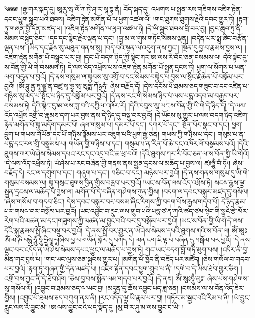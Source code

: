 \setcounter{footnote}{0} 
༄༅༅། །རྒྱ་གར་སྐད་དུ། ཨཱརྱཱ་ཝ་ལོ་ཀ་ཏེ་ཤྭ་ར་སཱ་དྷ་ནཾ། བོད་སྐད་དུ། འཕགས་པ་སྤྱན་རས་གཟིགས་འཇིག་རྟེན་དབང་ཕྱུག་སྒྲུབ་པའི་ཐབས། འཇིག་རྟེན་མགོན་པོ་ལ་ཕྱག་འཚལ་ལོ། །གང་ཐུགས་ཐུགས་རྗེའི་དབང་གྱུར་ཏེ། །རྟག་ཏུ་གཞན་གྱི་དོན་མཛད་པ། །འཇིག་རྟེན་མགོན་ལ་ཕྱག་འཚལ་ཏེ། །དེ་ཡི་སྒྲུབ་ཐབས་བྲི་བར་བྱ། །བྱང་ཆུབ་ཏུ་ནི་སེམས་བསྐྱེད་ཅིང་། །དད་དང་སྙིང་རྗེར་ལྡན་པ་དང་། །བླ་མ་ལ་གུས་གཏོང་སེམས་ལྡན། །བདེན་པར་སྨྲ་ཞིང་བརྩོན་ལྡན་པས། །ཡིད་དང་རྗེས་སུ་མཐུན་གནས་སུ། །བདེ་བའི་སྟན་ལ་འདུག་ནས་ཀྱང་། །སྔོན་དུ་བྱ་བ་རྣམས་བྱས་ལ། །འཇིག་རྟེན་མགོན་པོ་བསྒྲུབ་པར་བྱ། །དང་པོ་བདག་ཉིད་ཀྱི་སྙིང་གར་ཨ་ལས་རི་བོང་ཅན་བསམས་ལ། དེའི་སྟེང་དུ་ས་བོན་གྱི་ཡི་གེ་བསམས་ཏེ། དེ་ལས་འོད་འཕྲོས་པས་འཇིག་རྟེན་མགོན་པོ་སྤྱན་དྲངས་ཏེ། ཕྱག་ལ་སོགས་པ་ཡན་ལག་བདུན་པ་བྱའོ། །དེ་ནས་གསུམ་ལ་སྐྱབས་སུ་འགྲོ་བ་དང་སེམས་བསྐྱེད་པ་བྱས་ལ་སྙིང་རྗེ་ཆེན་པོ་བསྒོམ་པར་བྱའོ། །ཨོཾ་ཤཱུ་ནྱ་ཏཱ་ཛྙཱ་ན་བཛྲ་སྭ་བྷཱ་ཝ་ཨཱཏྨ་ཀོ྅ཧཾ། ཞེས་བརྗོད་དོ། །དེས་དངོས་པོ་ཐམས་ཅད་གཟུང་བ་དང་འཛིན་པ་གཉིས་སུ་མེད་པ་སྟོང་པ་ཉིད་དུ་བསྒོམ་པར་བྱའོ། །དེ་ནས་རང་གི་སེམས་ཉིད་པཾ་ལས་པདྨ་འདབ་མ་བརྒྱད་པར་བསམས་ཏེ། དེའི་སྟེང་དུ་ཨ་ལས་ཟླ་བའི་དཀྱིལ་འཁོར་རོ། །དེའི་དབུས་སུ་ཡང་ས་བོན་གྱི་ཡི་གེ་དེ་ཉིད་དོ། །དེ་ལས་འོད་འཕྲོས་འགྲོ་བ་རྣམས་དག་པར་བྱས་ནས་དེ་ཉིད་དུ་བསྡུ་བར་བྱའོ། །དེ་ཡོངས་སུ་གྱུར་པ་ལས་བདག་ཉིད་འཇིག་རྟེན་མགོན་པོ་སྐུ་མདོག་དམར་པོ། ཞལ་གསུམ་པ། དམར་པོ་དང་། དཀར་པོ་དང་། སྔོན་པོར་སྣང་བ་དང་། ཕྱག་དྲུག་པ་གཡས་གཡོན་དང་པོ་གཉིས་སྙོམས་པར་འཇུག་པའི་ཕྱག་རྒྱ་ཅན། གཡས་ཀྱི་གཉིས་པ་དང་། གསུམ་པ་ན་པདྨ་དང་རལ་གྲི་བསྣམས་པ། གཡོན་གྱི་གཉིས་པ་དང་། གསུམ་པ་ན་རིན་པོ་ཆེ་དང་འཁོར་ལོ་བསྣམས་པའོ། །དེའི་ཐུགས་ཀར་ཡེ་ཤེས་སེམས་དཔའ་རང་དང་འདྲ་བའི་ཆ་ཕྲ་བའོ། །དེའི་ཐུགས་ཀར་རི་བོང་ཅན་ལ་ས་བོན་གྱི་ཡི་གེའོ། །དེ་ལས་འོད་འཕྲོས་ཏེ། ཡེ་ཤེས་པ་རང་བཞིན་གྱི་གནས་ནས་སྤྱན་དྲངས་ལ་མཆོད་པ་བྱས་ལ། ཛཿཧཱུྃ་བཾ་ཧོཿ། ཞེས་བརྗོད་དེ། རང་ལ་དགུག་པ་དང་། གཞུག་པ་དང་། བཅིང་བ་དང་། མཉེས་པར་བྱའོ། །དེ་ནས་གནས་གསུམ་དུ་ཡི་གེ་གསུམ་བསམས་ལ། སྐུ་གསུང་ཐུགས་བྱིན་གྱིས་བརླབ་པར་བྱའོ། །ཡང་ས་བོན་ལས་འོད་འཕྲོས་ཏེ། སངས་རྒྱས་ལྔ་སྤྱན་དྲངས་ལ་མཆོད་པ་བྱས་ལ། མགོན་པོ་དེ་བཞིན་གཤེགས་ཀུན་གྱིས། །བདག་ལ་དབང་བསྐུར་མཛད་དུ་གསོལ། །ཞེས་གསོལ་བ་གདབ་ཅིང་། དེས་དབང་བསྐུར་བར་བསམ་ཞིང་རིགས་ཀྱི་བདག་པོས་རྒྱས་གདབ་པོ། དེ་ཉིད་རྣམ་པར་གསལ་བར་བསྒོམ་པར་བྱའོ། །ཡང་འབྱུང་བ་རླུང་ལས་གྲུབ་པའི་པདྨ་ཙ་ན་ཀའི་ཚད་ཙམ་སྟེང་གི་སྣའི་རྩེ་མོར་རེག་པའི་མཚན་མ་དང་།གཟུགས་ཀྱི་མཚན་མ་བྱུང་བའི་བར་དུ་བསྒོམ་པར་བྱའོ། །ཡང་ས་བོན་གྱི་ཡི་གེ་དེ་ལས་དེའི་སྐུ་རྣམས་སྤྲོ་ཞིང་བསྡུ་བར་བྱའོ། །དེ་ནས་སྤྲོ་བར་གྱུར་ན་ཡེ་ཤེས་སེམས་དཔའི་ཐུགས་ཀའི་ས་བོན་ལ། ཨོཾ་ཨཱཿཨོཾ་མ་ཎི་པདྨེ་ཧཱུྃ་ཧཱུཾ་ཧྲཱིསྭཱ་ཧཱ།ཞེས་བྱ་བ་གཡོན་སྐོར་དུ་བཀོད་དེ། མན་ངག་ཇི་ལྟ་བ་བཞིན་དུ་བསྒོམ་པར་བྱའོ། །དེ་ནས་ལྡང་བར་འདོད་ན་ཡེ་ཤེས་སེམས་དཔའ་ཕྱུང་ལ་མཆོད་པ་བྱས་ཏེ། གང་ཡང་བདག་བློ་གཏི་མུག་པས། །འདིར་ནི་བྱ་མིན་གང་བྱས་པ། །གང་ཡང་ལུས་ཅན་སྐྱབས་གྱུར་པ། །མགོན་པོ་ཁྱོད་ནི་བཟོད་པར་མཛོད། །ཅེས་གསོལ་བ་གདབ་པར་བྱའོ། །རྟག་ཏུ་གཞན་གྱི་དོན་མཛད་པ། །འཇིག་རྟེན་དབང་ཕྱུག་གྲུབ་པ་ནི། །དགེ་བ་དེ་ཡིས་ཐོབ་གྱུར་ཅིག །འགྲོ་བས་ཀྱང་ནི་དེ་ཐོབ་ཤོག །ཅེས་བྱ་བས་སྨོན་ལམ་གདབ་པར་བྱའོ། །དེ་ནས། ཨོཾ་ཨཱཿཧཱུྃ་མུཿ། ཞེས་པས་གཤེགས་སུ་གསོལ་ལོ། །འབྱུང་བ་ཐམས་ཅད་ལ་ཡང་བྱ། །མདུན་དུ་ཆོས་འབྱུང་པད་ཟླ་ཅན། །བསམས་ལ་ས་བོན་འོད་ཟེར་གྱིས། །འབྱུང་པོ་ཐམས་ཅད་བཀུག་ནས་ནི། །རང་འདོད་ལྷ་ཡི་རྣམ་པར་བྱ། །གཏོར་མ་སྦྱང་བའི་རིམ་པ་ནི། །ཡཾ་བྱུང་རླུང་ལས་རཾ་བྱུང་མེ། །ཨ་ལས་བྱུང་བའི་པད་སྣོད་དུ། །མུ་བི་ར་ཤུ་མ་ལས་བྱུང་བ་ཡི། །
